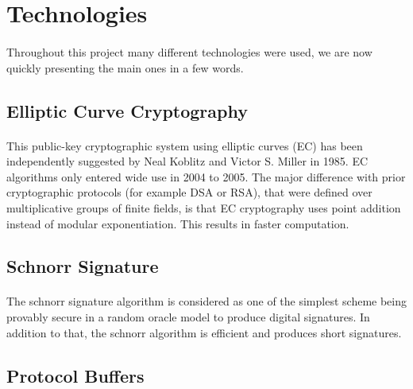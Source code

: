 \section{Technologies}

\paragraph{}
Throughout this project many different technologies were used, we are now quickly presenting the main ones in a few words.

\pagebreak
\subsection[Elliptic Curve Cryptography]{Elliptic Curve Cryptography\raisebox{.3\baselineskip}{\normalsize\footnotemark}}

\paragraph{}
This public-key cryptographic system using elliptic curves (EC) has been independently suggested by Neal Koblitz and Victor S. Miller in 1985. EC algorithms only entered wide use in 2004 to 2005. The major difference with prior cryptographic protocols (for example DSA or RSA), that were defined over multiplicative groups of finite fields, is that EC cryptography uses point addition instead of modular exponentiation. This results in faster computation.

\subsection[Schnorr Signature]{Schnorr Signature\raisebox{.3\baselineskip}{\normalsize\footnotemark}}

\paragraph{}
The schnorr signature algorithm is considered as one of the simplest scheme being provably secure in a random oracle model to produce digital signatures. In addition to that, the schnorr algorithm is efficient and produces short signatures.

\subsection[Protocol Buffers]{Protocol Buffers\raisebox{.3\baselineskip}{\normalsize\footnotemark}}

